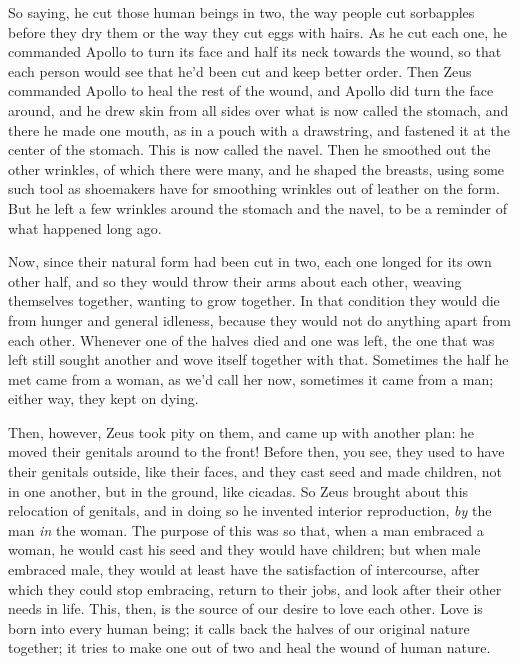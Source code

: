  So saying, he cut those human beings in two, the way people cut
sorbapples before they dry them or the way they cut eggs with hairs. As
he cut each one, he commanded Apollo to turn its face and half its neck
towards the wound, so that each person would see that he'd been cut and
keep better order. Then Zeus commanded Apollo to heal the rest of the
wound, and Apollo did turn the face around, and he drew skin from all
sides over what is now called the stomach, and there he made one mouth,
as in a pouch with a drawstring, and fastened it at the center of the
stomach.  This is now called the navel. Then he smoothed
out the other wrinkles, of which there were many, and he shaped the
breasts, using some such tool as shoemakers have for smoothing wrinkles
out of leather on the form. But he left a few wrinkles around the
stomach and the navel, to be a reminder of what happened long ago.

Now, since their natural form had been cut in two, each one longed for
its own other half, and so they would throw their arms about each other,
weaving themselves together, wanting to grow together. In that condition
 they would die from hunger and general idleness, because they
would not do anything apart from each other. Whenever one of the halves
died and one was left, the one that was left still sought another and
wove itself together with that. Sometimes the half he met came from a
woman, as we'd call her now, sometimes it came from a man; either way,
they kept on dying.

Then, however, Zeus took pity on them, and came up with another plan: he
moved their genitals around to the front! Before then, you see, they
 used to have their genitals outside, like their faces, and they
cast seed and made children, not in one another, but in the ground, like
cicadas. So Zeus brought about this relocation of genitals, and in doing
so he invented interior reproduction, {\em by} the man {\em in} the
woman. The purpose of this was so that, when a man embraced a woman, he
would cast his seed and they would have children; but when male embraced
male, they would at least have the satisfaction of intercourse, after
which they could stop embracing,  return to their jobs, and look
after their other needs in life. This, then, is the source of our desire
to love each other. Love is born into every human being; it calls back
the halves of our original nature together; it tries to make one out of
two and heal the wound of human nature.


